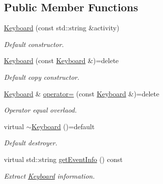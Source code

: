 \subsection*{Public Member Functions}
\begin{DoxyCompactItemize}
\item 
\hyperlink{class_spider_1_1_event_1_1_keyboard_a1fd20c190955bbe2856124e7f41dd8b7}{Keyboard} (const std\+::string \&activity)
\begin{DoxyCompactList}\small\item\em Default constructor. \end{DoxyCompactList}\item 
\mbox{\label{class_spider_1_1_event_1_1_keyboard_abe0da2633d327af5b491b02333616d65}} 
\hyperlink{class_spider_1_1_event_1_1_keyboard_abe0da2633d327af5b491b02333616d65}{Keyboard} (const \hyperlink{class_spider_1_1_event_1_1_keyboard}{Keyboard} \&)=delete
\begin{DoxyCompactList}\small\item\em Default copy constructor. \end{DoxyCompactList}\item 
\hyperlink{class_spider_1_1_event_1_1_keyboard}{Keyboard} \& \hyperlink{class_spider_1_1_event_1_1_keyboard_a4b6e022f756523104222e71d1d59fd54}{operator=} (const \hyperlink{class_spider_1_1_event_1_1_keyboard}{Keyboard} \&)=delete
\begin{DoxyCompactList}\small\item\em Operator equal overlaod. \end{DoxyCompactList}\item 
\mbox{\label{class_spider_1_1_event_1_1_keyboard_a2b7799295335ac4bea0bc4c3089b7b50}} 
virtual \hyperlink{class_spider_1_1_event_1_1_keyboard_a2b7799295335ac4bea0bc4c3089b7b50}{$\sim$\+Keyboard} ()=default
\begin{DoxyCompactList}\small\item\em Default destroyer. \end{DoxyCompactList}\item 
virtual std\+::string \hyperlink{class_spider_1_1_event_1_1_keyboard_a3ea8239e9f2002ea2a4eb5dd0bbbb55a}{get\+Event\+Info} () const
\begin{DoxyCompactList}\small\item\em Extract \hyperlink{class_spider_1_1_event_1_1_keyboard}{Keyboard} information. \end{DoxyCompactList}\item 

\end{DoxyCompactItemize}
